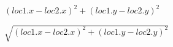 \documentclass{article}
\begin{document}
$ (loc1.x - loc2.x)^2 + (loc1.y - loc2.y)^2 $
\pagebreak

$ \sqrt{ (loc1.x - loc2.x)^2 + (loc1.y - loc2.y)^2 } $
\pagebreak
\end{document}
